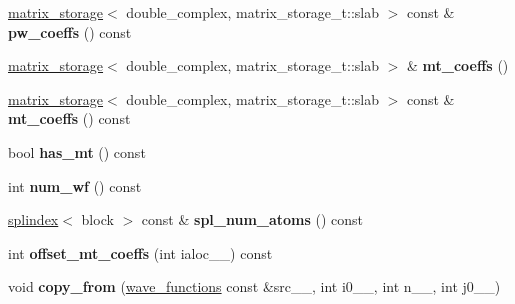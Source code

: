 \begin{DoxyCompactItemize}
\item 
\hypertarget{classsddk_1_1wave__functions_a6971313260ea42a0b1a42851c3da6518}{}\hyperlink{classsddk_1_1matrix__storage}{matrix\+\_\+storage}$<$ double\+\_\+complex, matrix\+\_\+storage\+\_\+t\+::slab $>$ const \& {\bfseries pw\+\_\+coeffs} () const \label{classsddk_1_1wave__functions_a6971313260ea42a0b1a42851c3da6518}

\item 
\hypertarget{classsddk_1_1wave__functions_abd463d27d98e6aaba348f927d5761863}{}\hyperlink{classsddk_1_1matrix__storage}{matrix\+\_\+storage}$<$ double\+\_\+complex, matrix\+\_\+storage\+\_\+t\+::slab $>$ \& {\bfseries mt\+\_\+coeffs} ()\label{classsddk_1_1wave__functions_abd463d27d98e6aaba348f927d5761863}

\item 
\hypertarget{classsddk_1_1wave__functions_a41aa641018ca07110fb3677689eaa3ae}{}\hyperlink{classsddk_1_1matrix__storage}{matrix\+\_\+storage}$<$ double\+\_\+complex, matrix\+\_\+storage\+\_\+t\+::slab $>$ const \& {\bfseries mt\+\_\+coeffs} () const \label{classsddk_1_1wave__functions_a41aa641018ca07110fb3677689eaa3ae}

\item 
\hypertarget{classsddk_1_1wave__functions_a3694465dcb89f35822ea4350c251e940}{}bool {\bfseries has\+\_\+mt} () const \label{classsddk_1_1wave__functions_a3694465dcb89f35822ea4350c251e940}

\item 
\hypertarget{classsddk_1_1wave__functions_a1fbfb51dc466ed9f7522ea8a6e835653}{}int {\bfseries num\+\_\+wf} () const \label{classsddk_1_1wave__functions_a1fbfb51dc466ed9f7522ea8a6e835653}

\item 
\hypertarget{classsddk_1_1wave__functions_a7a2b9ebc9789f35bae364f0288fa8408}{}\hyperlink{classsddk_1_1splindex}{splindex}$<$ block $>$ const \& {\bfseries spl\+\_\+num\+\_\+atoms} () const \label{classsddk_1_1wave__functions_a7a2b9ebc9789f35bae364f0288fa8408}

\item 
\hypertarget{classsddk_1_1wave__functions_ae6689451fd79fba63b5bc8802ed3e4f1}{}int {\bfseries offset\+\_\+mt\+\_\+coeffs} (int ialoc\+\_\+\+\_\+) const \label{classsddk_1_1wave__functions_ae6689451fd79fba63b5bc8802ed3e4f1}

\item 
\hypertarget{classsddk_1_1wave__functions_ab31bc72a152f41226318eadda0d8f2d2}{}void {\bfseries copy\+\_\+from} (\hyperlink{classsddk_1_1wave__functions}{wave\+\_\+functions} const \&src\+\_\+\+\_\+, int i0\+\_\+\+\_\+, int n\+\_\+\+\_\+, int j0\+\_\+\+\_\+)\label{classsddk_1_1wave__functions_ab31bc72a152f41226318eadda0d8f2d2}


\end{DoxyCompactItemize}
